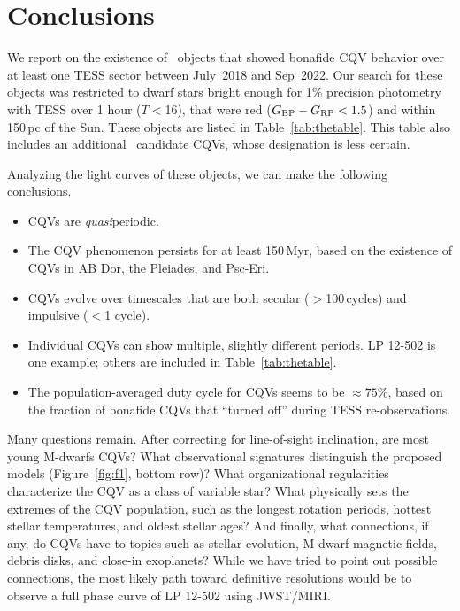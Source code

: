 \documentclass[11pt,twocolumn,tighten]{aastex63}
\newcommand{\bprp}{G_{\rm BP} - G_{\rm RP}}
\begin{document}
\section{Conclusions}
\label{sec:conclusion}

We report on the existence of \ngoods\ objects that showed bonafide
CQV behavior over at least one TESS sector between July~2018 and Sep~2022.
Our search for these objects was restricted to dwarf stars bright enough
for 1\% precision photometry with TESS over 1 hour ($T$$<$16),
that were red ($\bprp<1.5$) and within 150\,pc of the Sun.
These objects are listed in Table~\ref{tab:thetable}.
This table also includes an additional \nmaybes\ candidate CQVs, whose
designation is less certain.

Analyzing the light curves of these objects, we can make the following conclusions.

\begin{itemize}
	\item CQVs are {\it quasi}periodic.
	\item The CQV phenomenon persists for at least 150\,Myr, based on the
	existence of CQVs in AB Dor, the Pleiades, and Psc-Eri.
	\item CQVs evolve over timescales that are both secular ($>$100\,cycles) and impulsive ($<$1 cycle).
	\item Individual CQVs can show multiple, slightly different periods.  LP 12-502
	is one example; others are included in Table~\ref{tab:thetable}.
	\item The population-averaged duty cycle for CQVs seems to be $\approx 75$\%, based on 
	the fraction of bonafide CQVs that ``turned off'' during TESS re-observations.
\end{itemize}

Many questions remain.
After correcting for line-of-sight inclination, are
most young M-dwarfs CQVs?  What observational signatures distinguish
the proposed models (Figure~\ref{fig:f1}, bottom row)?  What
organizational regularities characterize the CQV as a class of
variable star?  What physically sets the extremes of the CQV population, such as
the longest rotation periods, hottest stellar temperatures, and oldest
stellar ages?  And finally, what connections, if any, do CQVs have to
topics such as stellar evolution, M-dwarf magnetic fields, debris
disks, and close-in exoplanets?
While we have tried to point out possible connections, the most
likely path toward definitive resolutions would be to observe a full
phase curve of LP 12-502 using JWST/MIRI.
\end{document}

